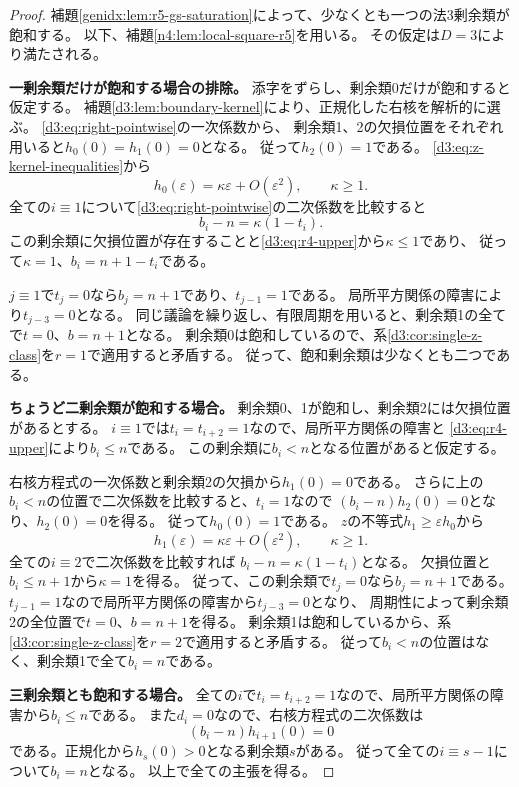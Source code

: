 \documentclass[11pt,a4paper]{ltjsarticle}
\theoremstyle{definition}
\begin{document}
\begin{proof}
補題\ref{genidx:lem:r5-gs-saturation}によって、少なくとも一つの法3剰余類が飽和する。
以下、補題\ref{n4:lem:local-square-r5}を用いる。
その仮定は$D=3$により満たされる。

\par\smallskip\noindent\textbf{一剰余類だけが飽和する場合の排除。}\quad
添字をずらし、剰余類0だけが飽和すると仮定する。
補題\ref{d3:lem:boundary-kernel}により、正規化した右核を解析的に選ぶ。
\eqref{d3:eq:right-pointwise}の一次係数から、
剰余類1、2の欠損位置をそれぞれ用いると$h_0(0)=h_1(0)=0$となる。
従って$h_2(0)=1$である。
\eqref{d3:eq:z-kernel-inequalities}から
\[
h_0(\varepsilon)=\kappa\varepsilon+O(\varepsilon^2),\qquad\kappa\ge1.
\]
全ての$i\equiv1$について\eqref{d3:eq:right-pointwise}の二次係数を比較すると
\[
b_i-n=\kappa(1-t_i).
\]
この剰余類に欠損位置が存在することと\eqref{d3:eq:r4-upper}から$\kappa\le1$であり、
従って$\kappa=1$、$b_i=n+1-t_i$である。

$j\equiv1$で$t_j=0$なら$b_j=n+1$であり、$t_{j-1}=1$である。
局所平方関係の障害により$t_{j-3}=0$となる。
同じ議論を繰り返し、有限周期を用いると、剰余類1の全てで$t=0$、$b=n+1$となる。
剰余類0は飽和しているので、系\ref{d3:cor:single-z-class}を$r=1$で適用すると矛盾する。
従って、飽和剰余類は少なくとも二つである。

\par\smallskip\noindent\textbf{ちょうど二剰余類が飽和する場合。}\quad
剰余類0、1が飽和し、剰余類2には欠損位置があるとする。
$i\equiv1$では$t_i=t_{i+2}=1$なので、局所平方関係の障害と
\eqref{d3:eq:r4-upper}により$b_i\le n$である。
この剰余類に$b_i<n$となる位置があると仮定する。

右核方程式の一次係数と剰余類2の欠損から$h_1(0)=0$である。
さらに上の$b_i<n$の位置で二次係数を比較すると、$t_i=1$なので
$(b_i-n)h_2(0)=0$となり、$h_2(0)=0$を得る。
従って$h_0(0)=1$である。
$z$の不等式$h_1\ge\varepsilon h_0$から
\[
h_1(\varepsilon)=\kappa\varepsilon+O(\varepsilon^2),\qquad\kappa\ge1.
\]
全ての$i\equiv2$で二次係数を比較すれば
$b_i-n=\kappa(1-t_i)$となる。
欠損位置と$b_i\le n+1$から$\kappa=1$を得る。
従って、この剰余類で$t_j=0$なら$b_j=n+1$である。
$t_{j-1}=1$なので局所平方関係の障害から$t_{j-3}=0$となり、
周期性によって剰余類2の全位置で$t=0$、$b=n+1$を得る。
剰余類1は飽和しているから、系\ref{d3:cor:single-z-class}を$r=2$で適用すると矛盾する。
従って$b_i<n$の位置はなく、剰余類1で全て$b_i=n$である。

\par\smallskip\noindent\textbf{三剰余類とも飽和する場合。}\quad
全ての$i$で$t_i=t_{i+2}=1$なので、局所平方関係の障害から$b_i\le n$である。
また$d_i=0$なので、右核方程式の二次係数は
\[
(b_i-n)h_{i+1}(0)=0
\]
である。正規化から$h_s(0)>0$となる剰余類$s$がある。
従って全ての$i\equiv s-1$について$b_i=n$となる。
以上で全ての主張を得る。
\end{proof}
\end{document}
